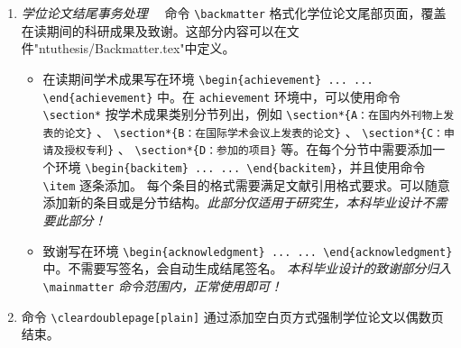 \begin{enumerate}
\begin{itemize}
    \item 命令 \verb|\appendix| 重定义附录章节计数格式，并初始化各个计数器。附录各个章节内容可以定义在文件"ntuthesis/Appendix.tex"中。
    \end{itemize}
    \item \emph{学位论文结尾事务处理}~~ 命令 \verb|\backmatter| 格式化学位论文尾部页面，覆盖在读期间的科研成果及致谢。这部分内容可以在文件"ntuthesis/Backmatter.tex"中定义。
        \begin{itemize}
        \item  在读期间学术成果写在环境 \verb|\begin{achievement} ... ... \end{achievement}| 中。在 \verb|achievement| 环境中，可以使用命令 \verb|\section*| 按学术成果类别分节列出，例如 \verb|\section*{A：在国内外刊物上发表的论文}| 、 \verb|\section*{B：在国际学术会议上发表的论文}| 、 \verb|\section*{C：申请及授权专利}| 、 \verb|\section*{D：参加的项目}| 等。在每个分节中需要添加一个环境 \verb|\begin{backitem} ... ... \end{backitem}|，并且使用命令 \verb|\item| 逐条添加。 每个条目的格式需要满足文献引用格式要求。可以随意添加新的条目或是分节结构。\emph{此部分仅适用于研究生，本科毕业设计不需要此部分！}
        \item 致谢写在环境 \verb|\begin{acknowledgment} ... ... \end{acknowledgment}| 中。不需要写签名，会自动生成结尾签名。
        \emph{本科毕业设计的致谢部分归入} \verb|\mainmatter| \emph{命令范围内，正常使用即可！}
        \end{itemize}
        
    \item 命令 \verb|\cleardoublepage[plain]| 通过添加空白页方式强制学位论文以偶数页结束。 
\end{enumerate}